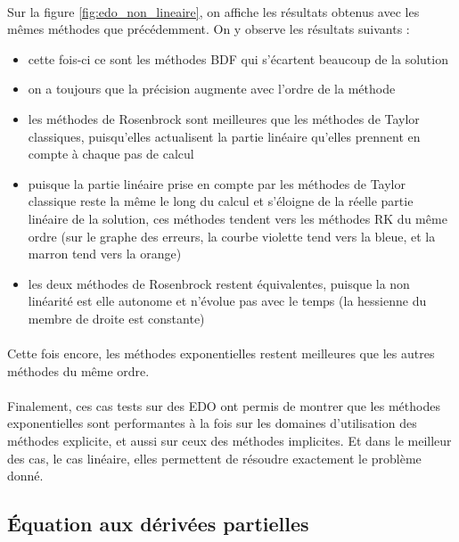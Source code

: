         \paragraph{}
        Sur la figure \ref{fig:edo_non_lineaire}, on affiche les résultats obtenus avec les mêmes méthodes que précédemment. On y observe les résultats suivants :
        \begin{itemize}
            \item cette fois-ci ce sont les méthodes BDF qui s'écartent beaucoup de la solution
            \item on a toujours que la précision augmente avec l'ordre de la méthode
            \item les méthodes de Rosenbrock sont meilleures que les méthodes de Taylor classiques, puisqu'elles actualisent la partie linéaire qu'elles prennent en compte à chaque pas de calcul
            \item puisque la partie linéaire prise en compte par les méthodes de Taylor classique reste la même le long du calcul et s'éloigne de la réelle partie linéaire de la solution, ces méthodes tendent vers les méthodes RK du même ordre (sur le graphe des erreurs, la courbe violette tend vers la bleue, et la marron tend vers la orange)
            \item les deux méthodes de Rosenbrock restent équivalentes, puisque la non linéarité est elle %
            autonome et n'évolue pas avec le temps (la hessienne du membre de droite est constante)
        \end{itemize}

        \paragraph{}
        Cette fois encore, les méthodes exponentielles restent meilleures que les autres méthodes du même ordre.

        \paragraph{}
        Finalement, ces cas tests sur des EDO ont permis de montrer que les méthodes exponentielles sont performantes à la fois sur les domaines d'utilisation des méthodes explicite, et aussi sur ceux des méthodes implicites. Et dans le meilleur des cas, le cas linéaire, elles permettent de résoudre exactement le problème donné.

\subsection{Équation aux dérivées partielles}


